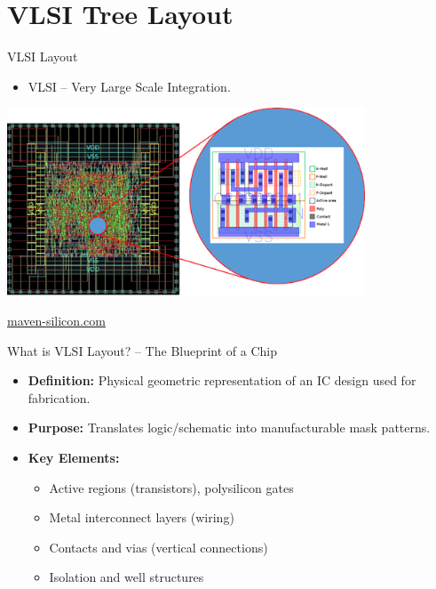 \documentclass{beamer}
\newcommand{\toRight}[1]{
    \begin{FlushRight}
        {\small #1}
    \end{FlushRight}
}
\begin{document}
\section{VLSI Tree Layout}

\begin{frame}{VLSI Layout}
    \begin{itemize}
        \item VLSI -- Very Large Scale Integration.
    \end{itemize}
    \centering
    \includegraphics[width=0.8\textwidth]{figures/vlsi}
    \toRight{\scriptsize \href{https://www.maven-silicon.com/blog/physical-design-flow/}{maven-silicon.com}}
\end{frame}

\begin{frame}{What is VLSI Layout? -- The Blueprint of a Chip}
    \begin{itemize}
    \item \textbf{Definition:} Physical geometric representation of an IC design used for fabrication.
    \item \textbf{Purpose:} Translates logic/schematic into manufacturable mask patterns.
    \item \textbf{Key Elements:}
        \begin{itemize}
        \item Active regions (transistors), polysilicon gates
        \item Metal interconnect layers (wiring)
        \item Contacts and vias (vertical connections)
        \item Isolation and well structures
        \end{itemize}
    \end{itemize}
\end{frame}
\end{document}
